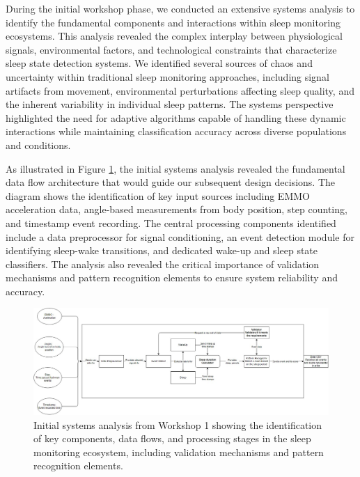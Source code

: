 \documentclass[conference]{IEEEtran}
\begin{document}
During the initial workshop phase, we conducted an extensive systems analysis to identify the fundamental components and interactions within sleep monitoring ecosystems. This analysis revealed the complex interplay between physiological signals, environmental factors, and technological constraints that characterize sleep state detection systems. We identified several sources of chaos and uncertainty within traditional sleep monitoring approaches, including signal artifacts from movement, environmental perturbations affecting sleep quality, and the inherent variability in individual sleep patterns. The systems perspective highlighted the need for adaptive algorithms capable of handling these dynamic interactions while maintaining classification accuracy across diverse populations and conditions.

As illustrated in Figure \ref{fig:workshop1_analysis}, the initial systems analysis revealed the fundamental data flow architecture that would guide our subsequent design decisions. The diagram shows the identification of key input sources including EMMO acceleration data, angle-based measurements from body position, step counting, and timestamp event recording. The central processing components identified include a data preprocessor for signal conditioning, an event detection module for identifying sleep-wake transitions, and dedicated wake-up and sleep state classifiers. The analysis also revealed the critical importance of validation mechanisms and pattern recognition elements to ensure system reliability and accuracy.

\begin{figure}[htbp]
	\centering
	\includegraphics[width=\columnwidth]{system_analysis_workshop1.png}
	\caption{Initial systems analysis from Workshop 1 showing the identification of key components, data flows, and processing stages in the sleep monitoring ecosystem, including validation mechanisms and pattern recognition elements.}
	\label{fig:workshop1_analysis}
\end{figure}
\end{document}
